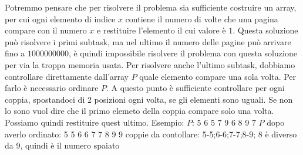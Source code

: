 
Potremmo pensare che per risolvere il problema sia sufficiente costruire un array, per cui ogni elemento  di indice $x$ contiene il numero di volte che una pagina compare con il numero $x$ e restituire l'elemento il cui valore è $1$. Questa soluzione può risolvere i primi subtask, ma nel ultimo il numero delle pagine può arrivare fino a $1000000000$, è quindi impossibile risolvere il problema con questa soluzione per via la troppa memoria usata.\itemize
Per risolvere anche l'ultimo subtask, dobbiamo controllare direttamente dall'array $P$ quale elemento compare una sola volta.  Per farlo è necessario ordinare $P$.  A questo punto è sufficiente controllare per ogni coppia, spostandoci di 2 posizioni ogni volta, se gli elementi sono uguali. Se non lo sono vuol dire che il primo elemeto della coppia compare solo una volta. Possiamo quindi restituire quest ultimo.\itemize\newline
Esempio:\newline
$P$: 5 6 5 7 9 6 8 9 7\itemize\newline
$P$ dopo averlo ordinato:  5 5 6 6 7 7 8 9 9\itemize \newline
coppie da contollare:  5-5;6-6;7-7;8-9; 8 è diverso da 9, quindi è il numero spaiato \itemize

\colorbox{white}{} 